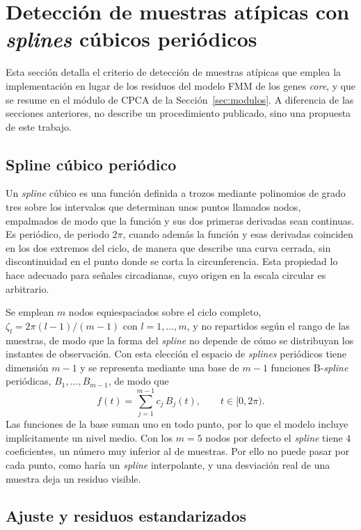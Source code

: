 \documentclass[12pt, a4paper]{report}
\begin{document}
\section{Detección de muestras atípicas con \textit{splines} cúbicos periódicos}
\label{sec:SplinePeriodico}

Esta sección detalla el criterio de detección de muestras atípicas que emplea la implementación en lugar de los residuos del modelo FMM de los genes \textit{core}, y que se resume en el módulo de CPCA de la Sección~\ref{sec:modulos}. A diferencia de las secciones anteriores, no describe un procedimiento publicado, sino una propuesta de este trabajo.

\subsection{Spline cúbico periódico}

Un \textit{spline} cúbico es una función definida a trozos mediante polinomios de grado tres sobre los intervalos que determinan unos puntos llamados nodos, empalmados de modo que la función y sus dos primeras derivadas sean continuas. Es periódico, de periodo \(2\pi\), cuando además la función y esas derivadas coinciden en los dos extremos del ciclo, de manera que describe una curva cerrada, sin discontinuidad en el punto donde se corta la circunferencia. Esta propiedad lo hace adecuado para señales circadianas, cuyo origen en la escala circular es arbitrario.

Se emplean \(m\) nodos equiespaciados sobre el ciclo completo, \(\zeta_l=2\pi(l-1)/(m-1)\) con \(l=1,\ldots,m\), y no repartidos según el rango de las muestras, de modo que la forma del \textit{spline} no depende de cómo se distribuyan los instantes de observación. Con esta elección el espacio de \textit{splines} periódicos tiene dimensión \(m-1\) y se representa mediante una base de \(m-1\) funciones B-\textit{spline} periódicas, \(B_1,\ldots,B_{m-1}\), de modo que
\[
f(t)=\sum_{j=1}^{m-1}c_j\,B_j(t),\qquad t\in[0,2\pi).
\]
Las funciones de la base suman uno en todo punto, por lo que el modelo incluye implícitamente un nivel medio. Con los \(m=5\) nodos por defecto el \textit{spline} tiene \(4\) coeficientes, un número muy inferior al de muestras. Por ello no puede pasar por cada punto, como haría un \textit{spline} interpolante, y una desviación real de una muestra deja un residuo visible.

\subsection{Ajuste y residuos estandarizados}
\end{document}
